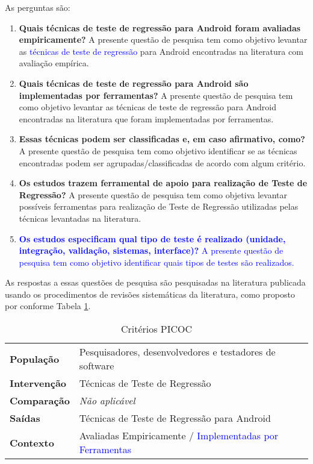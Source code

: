 As perguntas são:

\begin{enumerate}[label=\bf QP\arabic*,leftmargin=2.1cm]
  \item \textbf{Quais técnicas de teste de regressão para Android foram avaliadas empiricamente?} A presente questão de pesquisa tem como objetivo levantar as \textcolor{blue}{técnicas de teste de regressão} para Android encontradas na literatura com avaliação empírica.
  
  \item \textbf{Quais técnicas de teste de regressão para Android são implementadas por ferramentas?} A presente questão de pesquisa tem como objetivo levantar as técnicas de teste de regressão para Android encontradas na literatura que foram implementadas por ferramentas.
  
  \item \textbf{Essas técnicas podem ser classificadas e, em caso afirmativo, como?} A presente questão de pesquisa tem como objetivo identificar se as técnicas encontradas podem ser agrupadas/classificadas de acordo com algum critério.

  \item \textbf{Os estudos trazem ferramental de apoio para realização de Teste de Regressão?} A presente questão de pesquisa tem como objetiva levantar possíveis ferramentas para realização de Teste de Regressão utilizadas pelas técnicas levantadas na literatura.
  
  \item \textcolor{blue}{\textbf{Os estudos especificam qual tipo de teste é realizado (unidade, integração, validação, sistemas, interface)?} A presente questão de pesquisa tem como objetivo identificar quais tipos de testes são realizados.}
\end{enumerate}

As respostas a essas questões de pesquisa são pesquisadas na literatura publicada usando os procedimentos de revisões sistemáticas da literatura, como proposto por \cite{Kitchenham07guidelinesfor} conforme Tabela \ref{table:PICO}.

\begin{table}[h!]
    \footnotesize
    \centering
    \caption{Critérios PICOC}
    \label{table:PICO}
    \def \arraystretch{1.3}
    \begin{tabular}{m{2.3cm}m{9cm}}
        \toprule
        \textbf{População} & Pesquisadores, desenvolvedores e testadores de software\\
        \textbf{Intervenção} & Técnicas de Teste de Regressão\\ 
        \textbf{Comparação} & \textit{Não aplicável}\\
        \textbf{Saídas} & Técnicas de Teste de Regressão para Android\\
        \textbf{Contexto} & Avaliadas Empiricamente / \textcolor{blue}{Implementadas por Ferramentas}\\
        \bottomrule
    \end{tabular}
\end{table}

